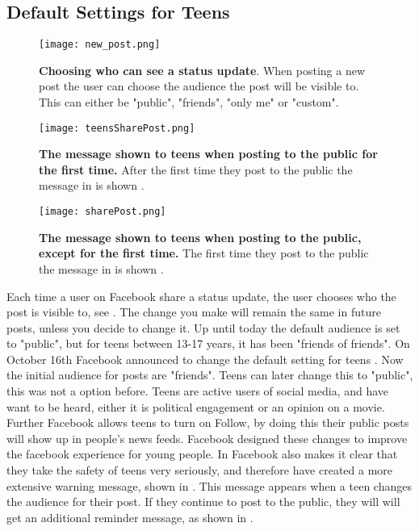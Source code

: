 \subsection{Default Settings for Teens}

\begin{figure}[h!]
\centering
\texttt{[image: new\_post.png]}
\caption[Choosing who can see a status update.]{\textbf{Choosing who can see a status update}. When posting a new post the user can choose the audience the post will be visible to. This can either be "public", "friends", "only me" or "custom".} 
\label{fig:newPost}
\end{figure}

\begin{figure}[h!]
\centering
\texttt{[image: teensSharePost.png]}
\caption[The message shown to teens when posting to the public for the first time]{\textbf{The message shown to teens when posting to the public for the first time.} After the first time they post to the public the message in  is shown \cite{defaultTeens}.} 
\label{fig:teensSharePost}
\end{figure}

\begin{figure}[h!]
\centering
\texttt{[image: sharePost.png]}
\caption [The message shown to teens when posting to the public, except for the first time]{\textbf{The message shown to teens when posting to the public, except for the first time.} The first time they post to the public the message in  is shown \cite{defaultTeens}.} 
\label{fig:sharePost}
\end{figure}

Each time a user on Facebook share a status update, the user chooses who the post is visible to, see . The change you make will remain the same in future posts, unless you decide to change it. Up until today the default audience is set to "public", but for teens between 13-17 years, it has been "friends of friends". On October 16th Facebook announced to change the default setting for teens \cite{defaultTeens}. Now the initial audience for posts are "friends". Teens can later change this to "public", this was not a option before. Teens are active users of social media, and have want to be heard, either it is political engagement or an opinion on a movie. Further Facebook allows teens to turn on Follow, by doing this their public posts will show up in people's news feeds. Facebook designed these changes to improve the facebook experience for young people. In \cite{defaultTeens} Facebook also makes it clear that they take the safety of teens very seriously, and therefore have created a more extensive warning message, shown in  . This message appears when a teen changes the audience for their post. If they continue to post to the public, they will will get an additional reminder message, as shown in  .

